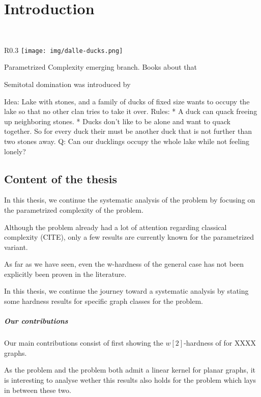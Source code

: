 \chapter{Introduction}\label{ch:introduction}

~\pagedepth\maxdimen

\begin{wrapfigure}{R}{0.3\textwidth}
    \texttt{[image: img/dalle-ducks.png]}
\end{wrapfigure}

Parametrized Complexity emerging branch. Books about that

Semitotal domination was introduced by 


Idea:  Lake with stones, and a family of ducks of fixed size wants to occupy the lake so that no other clan tries to take it over.
Rules: 
* A duck can quack freeing up neighboring stones.
* Ducks don't like to be alone and want to quack together. So for every duck their must be another duck that is not further than two stones away.
Q: Can our ducklings occupy the whole lake while not feeling lonely?


\section{Content of the thesis}

In this thesis, we continue the systematic analysis of the \sdom problem by focusing on the parametrized complexity of the problem. 

Although the problem already had a lot of attention regarding classical complexity (CITE), only a few results are currently known for the parametrized variant. 

As far as we have seen, even the w-hardness of the general case has not been explicitly been proven in the literature. 

In this thesis, we continue the journey toward a systematic analysis by stating some hardness results for specific graph classes for the problem.

\paragraph{Our contributions}

Our main contributions consist of first showing the $w[2]$-hardness of \sdom for XXXX graphs.

\noindent As the \dom problem and the \tdom problem both admit a linear kernel for planar graphs, it is interesting to analyse wether this results also holds for the \sdom problem which lays in between these two. 

